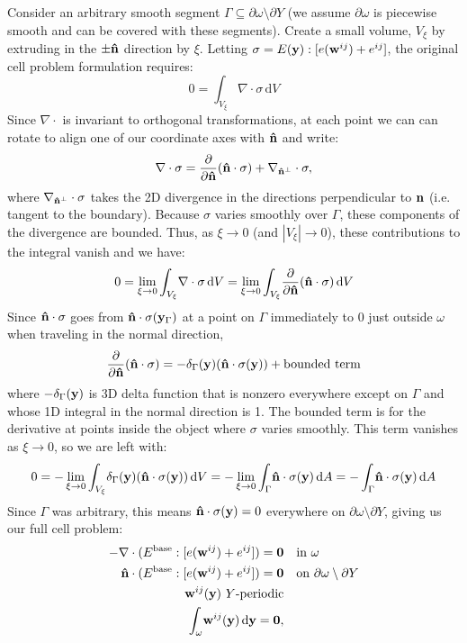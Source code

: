 \documentclass[10pt]{article}
\providecommand{\pder}[2]{\frac{\partial #1}{\partial #2}}
\begin{document}
Consider an arbitrary smooth segment $\Gamma \subseteq \partial \omega \setminus
\partial Y$ (we assume
$\partial \omega$ is piecewise smooth and can be covered with these segments).
Create a small volume, $V_\xi$ by extruding in the $\pm \bf \hat{n}$ direction
by $\xi$. Letting $\sigma = E({\bf y}) : [e({\bf w}^{ij}) + e^{ij}]$, the
original cell problem formulation requires:
$$
0 = \int_{V_\xi} \! \nabla \cdot \sigma \, \mathrm{d} V
$$
Since $\nabla \cdot$ is invariant to orthogonal transformations, at each point
we can can rotate to align one of our coordinate axes with ${\bf \hat{n}}$ and write:
$$
\nabla \cdot \sigma = \pder{}{\bf \hat{n}}({\bf \hat n} \cdot \sigma)  + \nabla_{{\bf \hat n}^\perp} \cdot \sigma,
$$
where $\nabla_{{\bf \hat n}^\perp} \cdot \sigma$ takes the 2D divergence in the
directions perpendicular to ${\bf n}$ (i.e. tangent to the boundary). Because
$\sigma$ varies smoothly over $\Gamma$, these components of the divergence are
bounded. Thus, as $\xi \to 0$ (and $|V_\xi| \to 0$), these contributions to the
integral vanish and we have:
$$
0 = \lim_{\xi \to 0} \int_{V_\xi} \! \nabla \cdot \sigma \, \mathrm{d} V  =
    \lim_{\xi \to 0} \int_{V_\xi} \! \pder{}{\bf \hat{n}}({\bf \hat n} \cdot \sigma) \, \mathrm{d} V
$$
Since ${\bf \hat n} \cdot \sigma$ goes from ${\bf \hat n} \cdot \sigma({\bf
y}_\Gamma)$ at a point on $\Gamma$ immediately to $0$ just outside $\omega$
when traveling in the normal direction,
$$
\pder{}{\bf \hat{n}}({\bf \hat n} \cdot \sigma) =
-\delta_\Gamma({\bf y}) ({\bf \hat n} \cdot \sigma({\bf y})) + \text{bounded term}
$$
where $-\delta_\Gamma({\bf y})$ is 3D delta function that is nonzero everywhere
except on $\Gamma$ and whose 1D integral in the normal direction is 1. The bounded
term is for the derivative at points inside the object where $\sigma$ varies
smoothly. This term vanishes as $\xi \to 0$, so we are left with:
$$
0 = -\lim_{\xi \to 0} \int_{V_\xi} \! \delta_\Gamma({\bf y}) ({\bf \hat n} \cdot \sigma({\bf y})) \, \mathrm{d} V =
    -\lim_{\xi \to 0} \int_{\Gamma} \! {\bf \hat n} \cdot \sigma({\bf y}) \, \mathrm{d} A =
    -\int_{\Gamma} \! {\bf \hat n} \cdot \sigma({\bf y}) \, \mathrm{d} A
$$
Since $\Gamma$ was arbitrary, this means ${\bf \hat n} \cdot \sigma({\bf y}) = 0$
everywhere on $\partial \omega \setminus \partial Y$, giving us our full cell
problem:
\begin{align*}
     -\nabla \cdot (E^\text{base} : [e({\bf w}^{ij}) + e^{ij}]) = {\bf 0} & \quad \text{in } \omega \\
{\bf \hat n} \cdot (E^\text{base} : [e({\bf w}^{ij}) + e^{ij}]) = {\bf 0} & \quad \text{on } \partial \omega \setminus \partial Y \\
    {\bf w}^{ij}({\bf y})\ Y \text{-periodic} & \\
    \int_\omega \! {\bf w}^{ij}({\bf y})  \, \mathrm{d} {\bf y} =  {\bf 0}, 
\end{align*}
\end{document}
